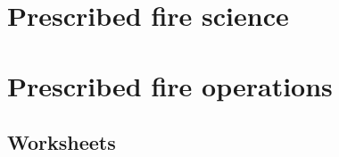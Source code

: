 \documentclass[twoside, 12pt]{tufte-book}
\begin{document}
 
%
%
\begin{titlepage} 
		
	\restoregeometry
\end{titlepage}
%
%
%			 
%
%

%
% 	
	\tableofcontents
\restoregeometry
%
%
\part{Prescribed fire science}
	
	
	
	


\part{Prescribed fire operations}
%	
 
 


%
%
\clearpage
\begin{fullwidth} %
 

\clearpage 
\part{Worksheets} 
	
\end{fullwidth}
%
\end{document}
